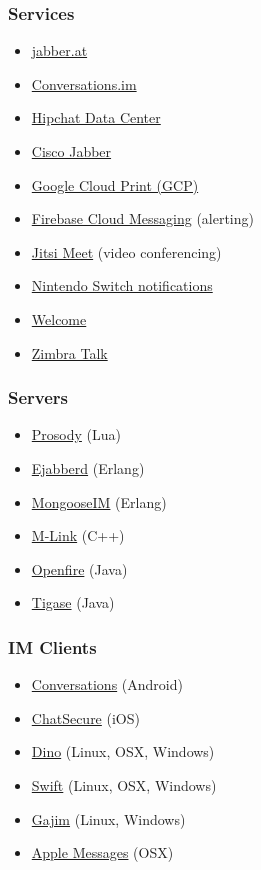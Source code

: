 \documentclass[xelatex,aspectratio=169]{beamer}
\begin{document}
\begin{frame}
	\frametitle{Services}
	\begin{itemize}
		\item\href{https://jabber.at/}{jabber.at}
		\item\href{https://account.conversations.im/}{Conversations.im}
		\item\href{https://www.atlassian.com/software/hipchat/enterprise/data-center}{%
				Hipchat Data Center}
		\item\href{https://www.cisco.com/c/en/us/products/unified-communications/jabber/index.html}{%
				Cisco Jabber}
		\item\href{https://developers.google.com/cloud-print/docs/rawxmpp}{%
				Google Cloud Print (GCP)}
		\item\href{https://firebase.google.com/docs/cloud-messaging/server}{%
				Firebase Cloud Messaging} (alerting)
		\item\href{https://meet.jit.si/}{Jitsi Meet} (video conferencing)
		\item\href{https://twitter.com/Midar3/status/839059229289943041}{%
				Nintendo Switch notifications}
		\item\href{https://welcomecommerce.com/}{Welcome}
		\item\href{https://www.zimbra.com/zimbra-talk/}{Zimbra Talk}
	\end{itemize}
\end{frame}

\begin{frame}
	\frametitle{Servers}
	\begin{itemize}
		\item\href{https://prosody.im/}{Prosody} (Lua)
		\item\href{https://www.ejabberd.im/}{Ejabberd} (Erlang)
		\item\href{https://www.erlang-solutions.com/products/mongooseim.html}{MongooseIM}
			(Erlang)
		\item\href{https://isode.com/products/m-link.html}{M-Link} (C++)
		\item\href{http://igniterealtime.org/projects/openfire/index.jsp}{Openfire}
			(Java)
		\item\href{http://tigase.net/content/tigase-xmpp-server}{Tigase} (Java)
	\end{itemize}
\end{frame}

\begin{frame}
	\frametitle{IM Clients}
	\begin{itemize}
		\item\href{https://conversations.im/}{Conversations} (Android)
		\item\href{https://chatsecure.org/}{ChatSecure} (iOS)
		\item\href{https://github.com/dino/dino}{Dino} (Linux, OSX, Windows)
		\item\href{https://swift.im/}{Swift} (Linux, OSX, Windows)
		\item\href{https://gajim.org/}{Gajim} (Linux, Windows)
		\item\href{https://support.apple.com/explore/messages}{Apple Messages} (OSX)
	\end{itemize}
\end{frame}
\end{document}
